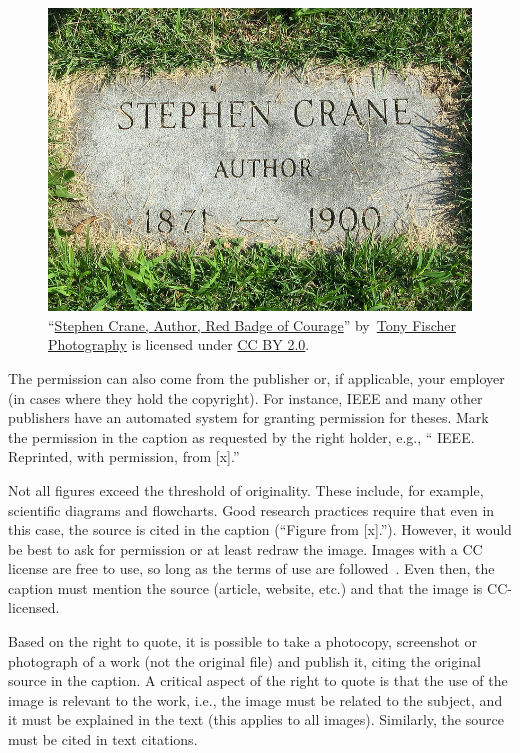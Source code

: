 \begin{figure}[H]
\begin{center}
  \includegraphics[width=12cm]{Figures/ccby.jpg}
\end{center}
\caption{``\href{https://openverse.org/image/110032f8-1a7a-421f-86b1-88fdfde2e44f
  }{Stephen Crane, Author, Red Badge of Courage}''
  by~\href{https://www.flickr.com/photos/tonythemisfit/}{Tony Fischer
  Photography} is licensed under
\href{https://creativecommons.org/licenses/by/2.0/}{CC BY 2.0}.}
\label{fig:ccbypic}
\end{figure}

The permission can also come from the publisher or, if applicable, your employer (in cases where they hold the copyright). For instance, IEEE and many other publishers have an automated system for granting permission for theses. Mark the permission in the caption as requested by the right holder, e.g., “ IEEE. Reprinted, with
permission, from [x].''

Not all figures exceed the threshold of originality. These include,
for example, scientific diagrams and flowcharts. Good research
practices require that even in this case, the source is cited in the
caption (\enquote{Figure from [x].}). However, it would be best to ask
for permission or at least redraw the image. Images with a CC license
are free to use, so long as the terms of use are
followed~\cite{about_cc_licenses}. Even then, the caption must mention
the source (article, website, etc.) and that the image is CC-licensed.

Based on the right to quote, it is possible to take a photocopy,
screenshot or photograph of a work (not the original file) and publish
it, citing the original source in the caption. A critical aspect of
the right to quote is that the use of the image is relevant to the
work, i.e., the image must be related to the subject, and it must be
explained in the text (this applies to all images). Similarly, the
source must be cited in text citations.


